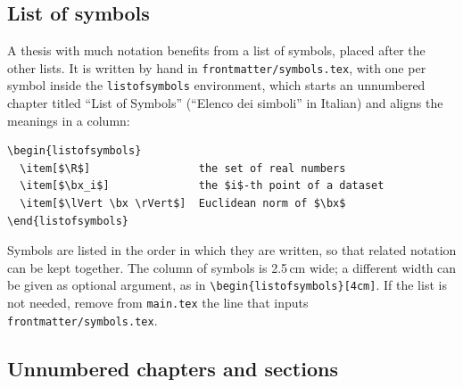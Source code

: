 \subsection{List of symbols} \label{sec:symbols}

A thesis with much notation benefits from a list of symbols, placed after
the other lists. It is written by hand in \nolinkurl{frontmatter/symbols.tex},
with one  per symbol inside the \texttt{listofsymbols}
environment, which starts an unnumbered chapter titled ``List of Symbols''
(``Elenco dei simboli'' in Italian) and aligns the meanings in a column:
\begin{Verbatim}
\begin{listofsymbols}
  \item[$\R$]                 the set of real numbers
  \item[$\bx_i$]              the $i$-th point of a dataset
  \item[$\lVert \bx \rVert$]  Euclidean norm of $\bx$
\end{listofsymbols}
\end{Verbatim}
Symbols are listed in the order in which they are written, so that related
notation can be kept together. The column of symbols is 2.5\,cm wide; a
different width can be given as optional argument, as in
\verb|\begin{listofsymbols}[4cm]|. If the list is not needed, remove from
\texttt{main.tex} the line that inputs \nolinkurl{frontmatter/symbols.tex}.

\subsection{Unnumbered chapters and sections}


